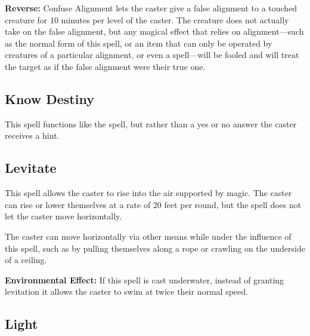 \begin{multicols*}{2}
\textbf{Reverse:} \hypertarget{spell:Confuse Alignment}{Confuse Alignment} lets the caster give a false alignment to a touched creature for 10 minutes per level of the caster. The creature does not actually take on the false alignment, but any magical effect that relies on alignment—such as the normal form of this spell, or an item that can only be operated by creatures of a particular alignment, or even a  spell—will be fooled and will treat the target as if the false alignment were their true one.

\subsection{Know Destiny}\label{spell:Know Destiny}

This spell functions like the  spell, but rather than a yes or no answer the caster receives a hint.

\subsection{Levitate}\label{spell:Levitate}

This spell allows the caster to rise into the air supported by magic. The caster can rise or lower themselves at a rate of 20 feet per round, but the spell does not let the caster move horizontally.

The caster can move horizontally via other means while under the influence of this spell, such as by pulling themselves along a rope or crawling on the underside of a ceiling.

\textbf{Environmental Effect:} If this spell is cast underwater, instead of granting levitation it allows the caster to swim at twice their normal speed.

\subsection{Light}\label{spell:Light}
\end{multicols*}
